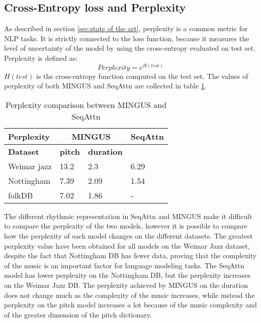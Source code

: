 \documentclass{article}
\begin{document}
\subsection{Cross-Entropy loss and Perplexity}
As described in section \ref{sec:state of the art}, perplexity is a common metric for NLP tasks. It is strictly connected to the loss function, because it measures the level of uncertainty of the model by using the cross-entropy evaluated on test set. Perplexity is defined as:
\[Perplexity = e^{H(test)}\]
$H(test)$ is the cross-entropy function computed on the test set. The values of perplexity of both MINGUS and SeqAttn are collected in table \ref{tab:perplexity}. 

\begin{table}[htbp]
	\caption{Perplexity comparison between MINGUS and SeqAttn}
	\begin{center}
		\begin{tabular}{ p{2cm} p{2cm} p{2cm} p{2cm} }
             \hline
             Perplexity &  
             \multicolumn{2}{c}{\textbf{MINGUS}} & 
             \textbf{SeqAttn} \\
             \hline
             \textbf{Dataset} &  
             \textbf{pitch} & 
             \textbf{duration} & \\
             \hline
             \hline
             Weimar jazz & 13.2 & 2.3 & 6.29 \\
             Nottingham & 7.39 & 2.09 & 1.54 \\
             folkDB & 7.02 & 1.86 & - \\
             \hline
    \end{tabular}
	\label{tab:perplexity}
	\end{center}
\end{table}

The different rhythmic representation in SeqAttn and MINGUS make it difficult to compare the perplexity of the two models, however it is possible to compare how the perplexity of each model changes on the different datasets. The greatest perplexity value have been obtained for all models on the Weimar Jazz dataset, despite the fact that Nottingham DB has fewer data, proving that the complexity of the music is an important factor for language modeling tasks. The SeqAttn model has lower perplexity on the Nottingham DB, but the perplexity increases on the Weimar Jazz DB. The perplexity achieved by MINGUS on the duration does not change much as the complexity of the music increases, while instead the perplexity on the pitch model increases a lot because of the music complexity and of the greater dimension of the pitch dictionary.
\end{document}
